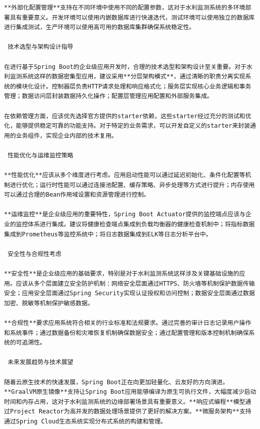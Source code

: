 \begin{lstlisting}
**外部化配置管理**支持在不同环境中使用不同的配置参数，这对于水利监测系统的多环境部署具有重要意义。开发环境可以使用内嵌数据库进行快速迭代，测试环境可以使用独立的数据库进行集成测试，生产环境可以使用高可用的数据库集群确保系统稳定性。

 技术选型与架构设计指导

在进行基于Spring Boot的企业级应用开发时，合理的技术选型和架构设计至关重要。对于水利监测系统这样的数据密集型应用，建议采用**分层架构模式**，通过清晰的职责分离实现系统的模块化设计。控制器层负责HTTP请求处理和响应格式化；服务层实现核心业务逻辑和事务管理；数据访问层封装数据持久化操作；配置层管理应用配置和外部服务集成。

在依赖管理方面，应该优先选择官方提供的starter依赖，这些starter经过充分的测试和优化，能够提供稳定可靠的功能支持。对于特定的业务需求，可以开发自定义的starter来封装通用的业务组件，实现企业内部的技术复用。

 性能优化与运维监控策略

**性能优化**应该从多个维度进行考虑。应用启动性能可以通过延迟初始化、条件化配置等机制进行优化；运行时性能可以通过连接池配置、缓存策略、异步处理等方式进行提升；内存使用可以通过合理的Bean作用域设置和资源管理进行控制。

**运维监控**是企业级应用的重要特性，Spring Boot Actuator提供的监控端点应该与企业的监控体系进行集成。建议将健康检查端点集成到负载均衡器的健康检查机制中；将指标数据集成到Prometheus等监控系统中；将日志数据集成到ELK等日志分析平台中。

 安全性与合规性考虑

**安全性**是企业级应用的基础要求，特别是对于水利监测系统这样涉及关键基础设施的应用。应该从多个层面建立安全防护机制：网络安全层面通过HTTPS、防火墙等机制保护数据传输安全；应用安全层面通过Spring Security实现认证授权和访问控制；数据安全层面通过数据加密、脱敏等机制保护敏感数据。

**合规性**要求应用系统符合相关的行业标准和法规要求。通过完善的审计日志记录用户操作和系统事件；通过数据备份和灾难恢复机制确保数据安全；通过配置管理和版本控制机制确保系统的可追溯性。

 未来发展趋势与技术展望

随着云原生技术的快速发展，Spring Boot正在向更加轻量化、云友好的方向演进。**GraalVM原生镜像**支持让Spring Boot应用能够编译为原生可执行文件，大幅度减少启动时间和内存占用，这对于水利监测系统的边缘部署场景具有重要意义。**响应式编程**模型通过Project Reactor为高并发的数据处理场景提供了更好的解决方案。**微服务架构**支持通过Spring Cloud生态系统实现分布式系统的构建和管理。


\end{lstlisting}
